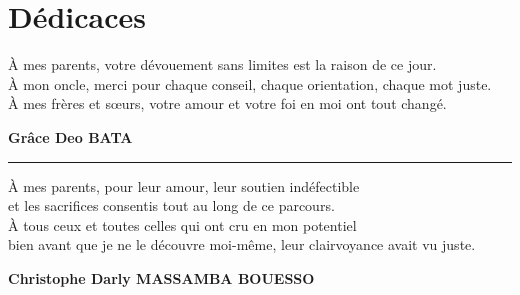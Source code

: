 \chapter*{Dédicaces}
\pagestyle{styleGlobal}
\label{sec:dedicace}

\begin{center}
	\itshape
	
	À mes parents,
	votre dévouement sans limites est la raison de ce jour.\\[0.2cm]
	
	À mon oncle,
	merci pour chaque conseil, chaque orientation, chaque mot juste.\\[0.2cm]
	
	À mes frères et sœurs,
	votre amour et votre foi en moi ont tout changé.\\[0.2cm]
	
\end{center}

\vspace{0.8cm}
\begin{flushright}
	\textbf{Grâce Deo BATA}
\end{flushright}

\vspace*{1cm}
\noindent\rule{\textwidth}{0.4pt}
\vspace*{1cm}

\begin{center}
	\itshape
	
	À mes parents, 
	pour leur amour, leur soutien indéfectible\\ 
	et les sacrifices consentis
	tout au long de ce parcours.\\[0.2cm]
	
	À tous ceux et toutes celles qui ont cru en mon potentiel\\
	bien avant que je ne le découvre moi-même, leur clairvoyance avait vu juste.
	
\end{center}

\vspace{0.8cm}
\begin{flushright}
	\textbf{Christophe Darly MASSAMBA BOUESSO}
\end{flushright}